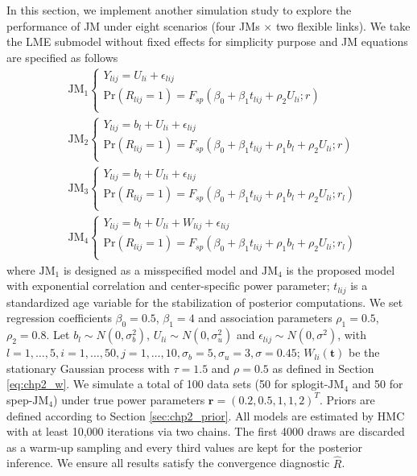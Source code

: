 In this section, we implement another simulation study to explore the performance of JM under eight scenarios (four JMs $\times$ two flexible links). We take the LME submodel without fixed effects for simplicity purpose and JM equations are specified as follows 
\begin{align*}
& \mbox{JM}_1 \left \{\begin{array}{ll}
        Y_{lij}= U_{li} + \epsilon_{lij} \\
       \mbox{Pr}(R_{lij}=1)=F_{sp}(\beta_0+\beta_1t_{lij}+ \rho_2 U_{li};r) \\
\end{array}\right. \\
& \mbox{JM}_2 \left \{\begin{array}{ll}
        Y_{lij}=b_l + U_{li} + \epsilon_{lij}\\
       \mbox{Pr}(R_{lij}=1)=F_{sp}(\beta_0+\beta_1t_{lij}+\rho_1 b_l + \rho_2 U_{li};r) \\
\end{array}\right. \\
&\mbox{JM}_3 \left \{\begin{array}{ll}
       Y_{lij}=b_l + U_{li} + \epsilon_{lij} \\
       \mbox{Pr}(R_{lij}=1)=F_{sp}(\beta_0+\beta_1t_{lij}+\rho_1 b_l + \rho_2 U_{li};r_l) \\
        \end{array}\right.\\
&\mbox{JM}_4 \left \{\begin{array}{ll}
        Y_{lij}=b_l + U_{li} + W_{lij} + \epsilon_{lij} \\
       \mbox{Pr}(R_{lij}=1)=F_{sp}(\beta_0+\beta_1t_{lij}+\rho_1 b_l + \rho_2 U_{li};r_l) \\
       \end{array}\right.        
\end{align*}
where $\mbox{JM}_1$ is designed as a misspecified model and $\mbox{JM}_4$ is the proposed model with exponential correlation and center-specific power parameter; $t_{lij}$ is a standardized age variable for the stabilization of posterior computations. We set regression coefficients $\beta_0=0.5$, $\beta_1=4$ and association parameters $\rho_1=0.5$, $\rho_2=0.8$. Let $b_l \sim N(0,\sigma^2_b)$, $U_{li} \sim N(0,\sigma^2_u)$ and $\epsilon_{lij} \sim N(0,\sigma^2)$, with $l=1, \dots,5, i=1, \dots, 50, j=1, \dots, 10, \sigma_b=5, \sigma_u=3, \sigma=0.45$; $W_{li}(\bm{t})$ be the stationary Gaussian process with $\tau=1.5$ and $\rho=0.5$ as defined in Section \ref{eq:chp2_w}. We simulate a total of 100 data sets (50 for splogit-$\mbox{JM}_4$ and 50 for spep-$\mbox{JM}_4$) under true power parameters $\bm{r}=(0.2, 0.5, 1, 1, 2)^T$. Priors are defined according to Section \ref{sec:chp2_prior}. All models are estimated by HMC with at least 10,000 iterations via two chains. The first 4000 draws are discarded as a warm-up sampling and every third values are kept for the posterior inference. We ensure all results satisfy the convergence diagnostic $\hat{R}$.

